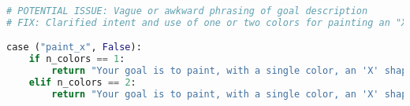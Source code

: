 \begin{anexes}
\begin{itemize}
\begin{lstlisting}[language=Python, caption={Mejora de redacción en \texttt{abstract\_description} para \texttt{paint\_x}}, label={lst:paintx_fix}, basicstyle=\ttfamily\small, frame=single]
# POTENTIAL ISSUE: Vague or awkward phrasing of goal description
# FIX: Clarified intent and use of one or two colors for painting an "X".

case ("paint_x", False):
    if n_colors == 1:
        return "Your goal is to paint, with a single color, an 'X' shape across the grid."
    elif n_colors == 2:
        return "Your goal is to paint, with a single color, an 'X' shape across the grid, and every other tile should be painted with a different color."
\end{lstlisting}

\end{itemize}

\end{anexes}
